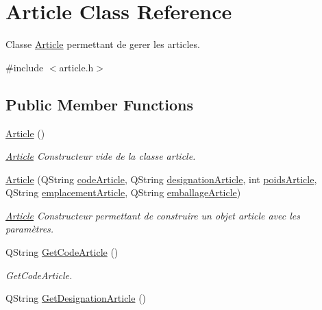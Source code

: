 \hypertarget{class_article}{}\section{Article Class Reference}
\label{class_article}


Classe \mbox{\hyperlink{class_article}{Article}} permettant de gerer les articles.  




{\ttfamily \#include $<$article.\+h$>$}

\subsection*{Public Member Functions}
\begin{DoxyCompactItemize}
\item 
\mbox{\hyperlink{class_article_aba1b3142ede0565d468cb4135384c96f}{Article}} ()
\begin{DoxyCompactList}\small\item\em \mbox{\hyperlink{class_article}{Article}} Constructeur vide de la classe article. \end{DoxyCompactList}\item 
\mbox{\hyperlink{class_article_a7422cbd424c70f209ef1bf83ea0fd42e}{Article}} (Q\+String \mbox{\hyperlink{class_article_a302186fb47a2b9bd8736bab99fe3ec75}{code\+Article}}, Q\+String \mbox{\hyperlink{class_article_a120a68e558a25bfd50bcc0ace22d6eef}{designation\+Article}}, int \mbox{\hyperlink{class_article_aaf339d5933ee1e8386dd57a8f84a9602}{poids\+Article}}, Q\+String \mbox{\hyperlink{class_article_a97f4fcb1534dbe969fcb2f6f2a8fdbd7}{emplacement\+Article}}, Q\+String \mbox{\hyperlink{class_article_a9ee6bb591aaba7535eac3d5965467965}{emballage\+Article}})
\begin{DoxyCompactList}\small\item\em \mbox{\hyperlink{class_article}{Article}} Constructeur permettant de construire un objet article avec les paramètres. \end{DoxyCompactList}\item 
Q\+String \mbox{\hyperlink{class_article_aa7a4dfd88216d2cea5d2393fac2af585}{Get\+Code\+Article}} ()
\begin{DoxyCompactList}\small\item\em Get\+Code\+Article. \end{DoxyCompactList}\item 
Q\+String \mbox{\hyperlink{class_article_af9b0da3a793b4a0dcfe8e97b24ac4f79}{Get\+Designation\+Article}} ()

\end{DoxyCompactItemize}
